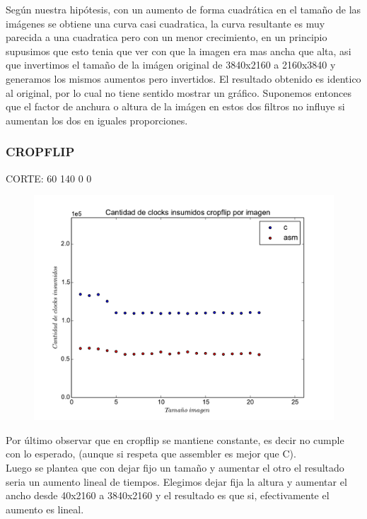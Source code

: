 Según nuestra hipótesis, con un aumento de forma cuadrática en el tamaño de las imágenes se obtiene una curva casi cuadratica, la curva resultante es muy parecida a una cuadratica pero con un menor crecimiento, en un principio supusimos que esto tenia que ver con que la imagen era mas ancha que alta, asi que invertimos el tamaño de la imágen original de 3840x2160 a 2160x3840 y generamos los mismos aumentos pero invertidos. El resultado obtenido es identico al original, por lo cual no tiene sentido mostrar un gráfico. Suponemos entonces que el factor de anchura o altura de la imágen en estos dos filtros no influye si aumentan los dos en iguales proporciones. \\

\subsubsection*{CROPFLIP}
CORTE: 60 140 0 0 

\begin{figure}
  \begin{center}
	\includegraphics[scale=0.5]{cropflipall.pdf}
  \end{center}
\end{figure}

Por último observar que en cropflip se mantiene constante, es decir no cumple con lo esperado, (aunque si respeta que assembler es mejor que C). \\

Luego se plantea que con dejar fijo un tamaño y aumentar el otro el resultado seria un aumento lineal de tiempos. Elegimos dejar fija la altura y aumentar el ancho desde 40x2160 a 3840x2160 y el resultado es que si, efectivamente el aumento es lineal. \\

